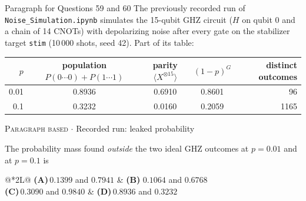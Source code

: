 \documentclass[11pt,a4paper]{article}
\newcommand{\optlabel}[1]{\textbf{(#1)}}
\newcommand{\correctlabel}[1]{\textcolor{okgreen}{\textbf{(#1)}\,\ding{51}}}
\newenvironment{qitem}[1]{\begin{list}{}{\setlength{\leftmargin}{3.3em}\setlength{\labelwidth}{3.1em}%
  \setlength{\labelsep}{0.2em}\setlength{\topsep}{3pt}\setlength{\parsep}{3pt}}\item[\textbf{Q.#1}\hfill]}{\end{list}}
\newcommand{\qmeta}[2]{{\footnotesize\color{black!60}\textsc{#1} \;$\cdot$\; #2}\par}
\begin{document}
\begin{passagebox}{Paragraph for Questions 59 and 60}
The previously recorded run of \texttt{Noise\_Simulation.ipynb} simulates the 15-qubit GHZ circuit ($H$ on qubit 0 and a chain of
14 CNOTs) with depolarizing noise after every gate on the stabilizer target \texttt{stim} (10\,000 shots, seed 42). Part of its table:
\begin{center}\small
\begin{tabular}{rcccr}\toprule
$p$ & population $P(0\cdots0) + P(1\cdots1)$ & parity $\langle X^{\otimes15}\rangle$ & $(1-p)^G$ & distinct outcomes\\ \midrule
0.01 & 0.8936 & 0.6910 & 0.8601 & 96\\
0.1 & 0.3232 & 0.0160 & 0.2059 & 1165\\ \bottomrule
\end{tabular}
\end{center}
\end{passagebox}
\begin{qitem}{59}
\qmeta{Paragraph based}{Recorded run: leaked probability}
The probability mass found \emph{outside} the two ideal GHZ outcomes at $p = 0.01$ and at $p = 0.1$ is
\par\smallskip\noindent\begin{tabularx}{\linewidth}{@{}*{2}{L}@{}}
\optlabel{A}\,$0.1399$ and $0.7941$ & \correctlabel{B}\,$0.1064$ and $0.6768$ \\[3pt]
\optlabel{C}\,$0.3090$ and $0.9840$ & \optlabel{D}\,$0.8936$ and $0.3232$
\end{tabularx}
\end{qitem}
\end{document}

